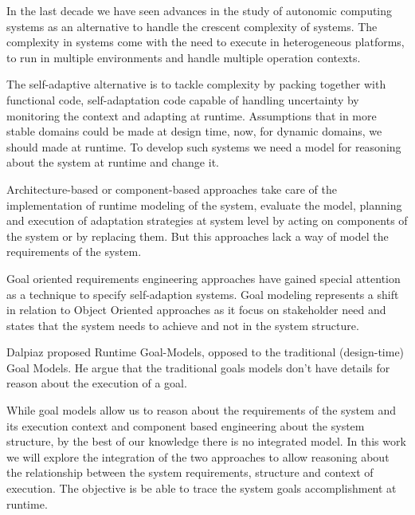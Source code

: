 In the last decade we have seen advances in the study of autonomic computing systems as an alternative to handle the crescent complexity of systems. The complexity in systems come with the need to execute in heterogeneous platforms, to run in multiple environments and handle multiple operation contexts.



The self-adaptive alternative is to tackle complexity by packing together with functional code, self-adaptation code capable of handling uncertainty by monitoring the context and adapting at runtime. Assumptions that in more stable domains could be made at design time, now, for dynamic domains, we should made at runtime. To develop such systems we need a model for reasoning about the system at runtime and change it.


Architecture-based or component-based approaches take care of the implementation of runtime modeling of the system, evaluate the model, planning and execution of adaptation strategies at system level by acting on components of the system or by replacing them\cite{garlan_software_2009}. But this approaches lack a way of model the requirements of the system.

Goal oriented requirements engineering approaches have gained special attention as a technique to specify self-adaption systems. Goal modeling represents a shift in relation to Object Oriented approaches as it focus on stakeholder need and states that the system needs to achieve and not in the system structure. \cite{ali_goal-based_2010}

Dalpiaz proposed Runtime Goal-Models, opposed to the traditional (design-time) Goal Models. He argue that the traditional goals models don't have details for reason about the execution of a goal. \cite{dalpiaz_runtime_2013} %



 While goal models allow us to reason about the requirements of the system and its execution context and component based engineering about the system structure, by the best of our knowledge there is no integrated model.
 In this work we will explore the integration of the two approaches to allow reasoning about the relationship between the system requirements, structure and context of execution. The objective is be able to trace the system goals accomplishment at runtime.
